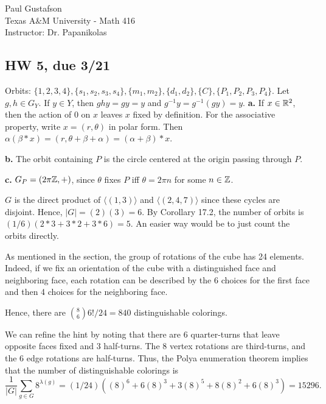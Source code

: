 \documentclass{article}
\begin{document}
\noindent Paul Gustafson\\
\noindent Texas A\&M University - Math 416\\
\noindent Instructor: Dr. Papanikolas

\subsection*{HW 5, due 3/21}


 Orbits: $\{1,2,3,4\}, \{s_1, s_2, s_3, s_4\}, \{m_1, m_2\}, \{d_1, d_2\},
\{C\}, \{P_1, P_2, P_3, P_4\}$.
  Let $g,h \in G_Y$. If $y \in Y$, then $ghy = gy = y$ and $g^{-1}y = g^{-1}(gy) = y$.
 \textbf{a.} If $x \in \mathbb{R}^2$, then the action of $0$ on $x$ leaves $x$ fixed by definition.  For the associative property, write $x = (r,\theta)$ in polar form.  Then $\alpha(\beta * x) = (r, \theta + \beta + \alpha) 
= (\alpha +\beta) * x$.

\textbf{b.} The orbit containing $P$ is the circle centered at the origin passing through $P$.

\textbf{c.} $G_P = (2\pi\mathbb{Z},+)$, since $\theta$ fixes $P$ iff $\theta = 2\pi n$ for some $n \in \mathbb{Z}$.

 $G$ is the direct product of $\langle (1, 3) \rangle$ and $\langle (2, 4, 7) \rangle$ since these cycles are disjoint.  Hence, $|G| = (2)(3) = 6$.
By Corollary 17.2, the number of orbits is $(1/6)(2*3 + 3*2 + 3*6) = 5$. An easier way would be to just count the orbits directly.

 As mentioned in the section, the group of rotations of the cube has 24 elements. Indeed, if we fix an orientation of the cube with a distinguished face and neighboring face, each rotation can be described by the 6 choices for the first face and then 4 choices for the neighboring face.

Hence, there are ${8 \choose 6} 6!/24 = 840$ distinguishable colorings.

 We can refine the hint by noting that there are 6 quarter-turns that leave opposite faces fixed and 3 half-turns. The 8 vertex rotations are third-turns, and the 6 edge rotations are half-turns. Thus, the Polya enumeration theorem implies that the number of distinguishable colorings is
$$ \frac 1 {|G|} \sum_{g \in G} 8^{\lambda(g)} = (1/24) ((8)^6 + 6(8)^3 + 3(8)^5 + 8(8)^2 + 6(8)^3) = 15296.$$
\end{document}
